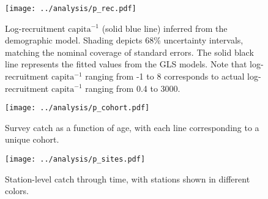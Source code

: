 \documentclass[11pt]{article}
\begin{document}
\clearpage
\begin{figure}
\centering
\texttt{[image: ../analysis/p\_rec.pdf]}
\caption{\label{fig:p_rec}
Log-recruitment $\text{capita}^{-1}$ (solid blue line) inferred from the demographic model.
Shading depicts 68\% uncertainty intervals, 
matching the nominal coverage of standard errors.
The solid black line represents the fitted values from the GLS models.
Note that log-recruitment $\text{capita}^{-1}$ ranging from -1 to 8 
corresponds to actual log-recruitment $\text{capita}^{-1}$ ranging from 0.4 to 3000.
}
\end{figure}
\clearpage







\renewcommand{\thefigure}{S\arabic{figure}}
\renewcommand{\theequation}{S\arabic{equation}}
\renewcommand{\thetable}{S\arabic{table}}
\setcounter{equation}{0}
\setcounter{figure}{0}
\setcounter{table}{0}

\begin{figure}
\centering
\texttt{[image: ../analysis/p\_cohort.pdf]}
\caption{\label{fig:p_cohort}
Survey catch as a function of age, with each line corresponding to a unique cohort.
}
\end{figure}
\clearpage

\begin{figure}
\centering
\texttt{[image: ../analysis/p\_sites.pdf]}
\caption{\label{fig:p_sites}
Station-level catch through time, with stations shown in different colors.
}
\end{figure}
\clearpage
\end{document}

